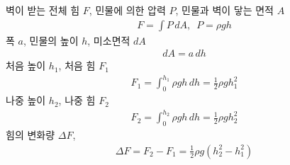 \documentclass[floatfix,nofootinbib,superscriptaddress,fleqn]{revtex4-2}
\begin{document}
벽이 받는 전체 힘 $F$, 민물에 의한 압력 $P$, 민물과 벽이 닿는 면적 $A$
\begin{align}
  F = \int P\,dA,\,\,\,P = \rho g h
\end{align}
폭 $a$, 민물의 높이 $h$, 미소면적 $dA$
\begin{align}
  dA = a\,dh
\end{align}
처음 높이 $h_1$, 처음 힘 $F_1$
\begin{align}
  F_1 = \int_0^{h_1}\rho g h\,dh = \frac{1}{2}\rho g h^2_1
\end{align}
나중 높이 $h_2$, 나중 힘 $F_2$
\begin{align}
  F_2 = \int_0^{h_2}\rho g h\,dh = \frac{1}{2}\rho g h^2_2
\end{align}
힘의 변화량 $\Delta F$,
\begin{align}
  \Delta F = F_2 - F_1 = \frac{1}{2}\rho g \left(h^2_2-h^2_1\right)
\end{align}
\vspace{1.cm}
\end{document}
